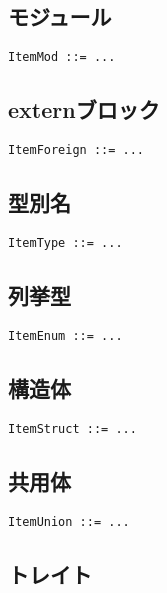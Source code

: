 \documentclass[dvipdfmx,uplatex,papersize,a4paper,10pt]{jsbook}
\theoremstyle{definition}
\begin{document}
\subsection{モジュール}

\begin{lstlisting}[language=BNFLike, gobble=2]
  ItemMod ::= ...
\end{lstlisting}

\subsection{externブロック}

\begin{lstlisting}[language=BNFLike, gobble=2]
  ItemForeign ::= ...
\end{lstlisting}

\subsection{型別名}

\begin{lstlisting}[language=BNFLike, gobble=2]
  ItemType ::= ...
\end{lstlisting}

\subsection{列挙型}

\begin{lstlisting}[language=BNFLike, gobble=2]
  ItemEnum ::= ...
\end{lstlisting}

\subsection{構造体}

\begin{lstlisting}[language=BNFLike, gobble=2]
  ItemStruct ::= ...
\end{lstlisting}

\subsection{共用体}

\begin{lstlisting}[language=BNFLike, gobble=2]
  ItemUnion ::= ...
\end{lstlisting}

\subsection{トレイト}
\end{document}
